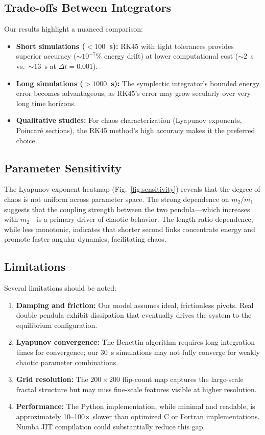 \documentclass[11pt,a4paper]{article}
\newcommand{\dt}{\Delta t}
\begin{document}
\subsection{Trade-offs Between Integrators}

Our results highlight a nuanced comparison:
\begin{itemize}
  \item \textbf{Short simulations ($<100$~s):} RK45 with tight tolerances
        provides superior accuracy ($\sim 10^{-7}$\% energy drift) at lower
        computational cost ($\sim2$~s vs.\ $\sim13$~s at $\dt=0.001$).
  \item \textbf{Long simulations ($>1000$~s):} The symplectic integrator's
        bounded energy error becomes advantageous, as RK45's error may grow
        secularly over very long time horizons.
  \item \textbf{Qualitative studies:} For chaos characterization (Lyapunov
        exponents, Poincar\'e sections), the RK45 method's high accuracy
        makes it the preferred choice.
\end{itemize}

\subsection{Parameter Sensitivity}

The Lyapunov exponent heatmap (Fig.~\ref{fig:sensitivity}) reveals that the
degree of chaos is not uniform across parameter space. The strong dependence on
$m_2/m_1$ suggests that the coupling strength between the two pendula---which
increases with $m_2$---is a primary driver of chaotic behavior. The length
ratio dependence, while less monotonic, indicates that shorter second links
concentrate energy and promote faster angular dynamics, facilitating chaos.

\subsection{Limitations}

Several limitations should be noted:
\begin{enumerate}
  \item \textbf{Damping and friction:} Our model assumes ideal, frictionless
        pivots. Real double pendula exhibit dissipation that eventually drives
        the system to the equilibrium configuration.
  \item \textbf{Lyapunov convergence:} The Benettin algorithm requires long
        integration times for convergence; our 30~s simulations may not fully
        converge for weakly chaotic parameter combinations.
  \item \textbf{Grid resolution:} The $200 \times 200$ flip-count map captures
        the large-scale fractal structure but may miss fine-scale features
        visible at higher resolution.
  \item \textbf{Performance:} The Python implementation, while minimal and
        readable, is approximately 10--100$\times$ slower than optimized C or
        Fortran implementations. Numba JIT compilation could substantially
        reduce this gap.
\end{enumerate}
\end{document}
